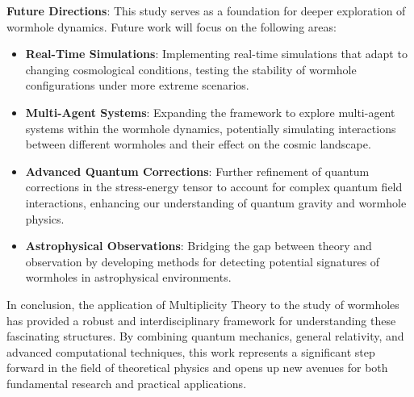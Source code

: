 \documentclass{article}
\theoremstyle{plain}
\begin{document}
\textbf{Future Directions}: This study serves as a foundation for deeper exploration of wormhole dynamics. Future work will focus on the following areas:
\begin{itemize}
    \item \textbf{Real-Time Simulations}: Implementing real-time simulations that adapt to changing cosmological conditions, testing the stability of wormhole configurations under more extreme scenarios.
    \item \textbf{Multi-Agent Systems}: Expanding the framework to explore multi-agent systems within the wormhole dynamics, potentially simulating interactions between different wormholes and their effect on the cosmic landscape.
    \item \textbf{Advanced Quantum Corrections}: Further refinement of quantum corrections in the stress-energy tensor to account for complex quantum field interactions, enhancing our understanding of quantum gravity and wormhole physics.
    \item \textbf{Astrophysical Observations}: Bridging the gap between theory and observation by developing methods for detecting potential signatures of wormholes in astrophysical environments.
\end{itemize}

In conclusion, the application of Multiplicity Theory to the study of wormholes has provided a robust and interdisciplinary framework for understanding these fascinating structures. By combining quantum mechanics, general relativity, and advanced computational techniques, this work represents a significant step forward in the field of theoretical physics and opens up new avenues for both fundamental research and practical applications.

\nocite{*}


\end{document}
